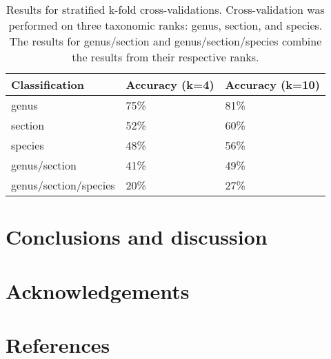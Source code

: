 \documentclass[review,3p,twocolumn]{elsarticle}
\begin{document}
\begin{table*}[t]\footnotesize
    \caption{Results for stratified k-fold cross-validations. Cross-validation was performed on three taxonomic ranks: genus, section, and species. The results for genus/section and genus/section/species combine the results from their respective ranks.}
    \begin{center}
    \begin{tabular}{lp{3cm}p{3cm}}
    \toprule
    \textbf{Classification} & \textbf{Accuracy (k=4)} & \textbf{Accuracy (k=10)} \\
    \midrule
    genus                   & 75\%    & 81\% \\
    section                 & 52\%    & 60\% \\
    species                 & 48\%    & 56\% \\
    genus/section           & 41\%    & 49\% \\
    genus/section/species   & 20\%    & 27\% \\
    \bottomrule
    \end{tabular}
    \end{center}
    \label{tbl:x-validation-results}
\end{table*}

\section{Conclusions and discussion}
\label{sect:conclusion}


\lipsum[1]

\section*{Acknowledgements}


\lipsum[1]



\section*{References}
\end{document}

